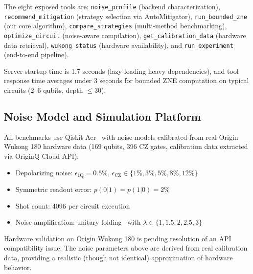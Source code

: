 The eight exposed tools are: \texttt{noise\_profile} (backend characterization), \texttt{recommend\_mitigation} (strategy selection via AutoMitigator), \texttt{run\_bounded\_zne} (our core algorithm), \texttt{compare\_strategies} (multi-method benchmarking), \texttt{optimize\_circuit} (noise-aware compilation), \texttt{get\_calibration\_data} (hardware data retrieval), \texttt{wukong\_status} (hardware availability), and \texttt{run\_experiment} (end-to-end pipeline).

Server startup time is 1.7 seconds (lazy-loading heavy dependencies), and tool response time averages under 3 seconds for bounded ZNE computation on typical circuits (2--6 qubits, depth $\leq 30$).

\subsection{Noise Model and Simulation Platform}
\label{sec:noise_model}

All benchmarks use Qiskit Aer~\cite{Qiskit2024} with noise models calibrated from real Origin Wukong 180 hardware data (169 qubits, 396 CZ gates, calibration data extracted via OriginQ Cloud API):
\begin{itemize}
    \item Depolarizing noise: $\epsilon_\text{1Q} = 0.5\%$, $\epsilon_\text{CZ} \in \{1\%, 3\%, 5\%, 8\%, 12\%\}$
    \item Symmetric readout error: $p(0|1) = p(1|0) = 2\%$
    \item Shot count: 4096 per circuit execution
    \item Noise amplification: unitary folding~\cite{GiurgicaTiron2020} with $\lambda \in \{1, 1.5, 2, 2.5, 3\}$
\end{itemize}

Hardware validation on Origin Wukong 180 is pending resolution of an API compatibility issue. The noise parameters above are derived from real calibration data, providing a realistic (though not identical) approximation of hardware behavior.
